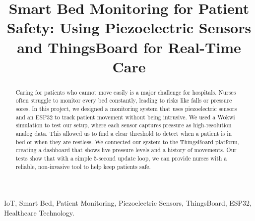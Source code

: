 \documentclass[conference]{IEEEtran}
\begin{document}
\title{Smart Bed Monitoring for Patient Safety: Using Piezoelectric Sensors and ThingsBoard for Real-Time Care}

\author{
\and
{}
\and
{}
}

\maketitle

\begin{abstract}
Caring for patients who cannot move easily is a major challenge for hospitals. Nurses often struggle to monitor every bed constantly, leading to risks like falls or pressure sores. In this project, we designed a monitoring system that uses piezoelectric sensors and an ESP32 to track patient movement without being intrusive. We used a Wokwi simulation to test our setup, where each sensor captures pressure as high-resolution analog data. This allowed us to find a clear threshold to detect when a patient is in bed or when they are restless. We connected our system to the ThingsBoard platform, creating a dashboard that shows live pressure levels and a history of movements. Our tests show that with a simple 5-second update loop, we can provide nurses with a reliable, non-invasive tool to help keep patients safe.
\end{abstract}

\begin{IEEEkeywords}
IoT, Smart Bed, Patient Monitoring, Piezoelectric Sensors, ThingsBoard, ESP32, Healthcare Technology.
\end{IEEEkeywords}
\end{document}
